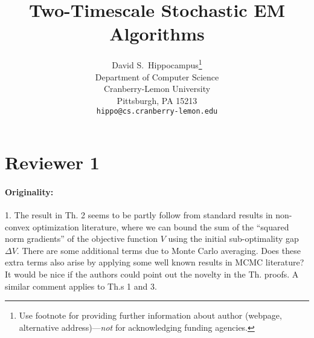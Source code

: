 \documentclass[anon,12pt]{alt2021} %
\title{Two-Timescale Stochastic EM Algorithms\vspace{-0.15in}}
\begin{document}
\maketitle


\author{%
  David S.~Hippocampus\thanks{Use footnote for providing further information
    about author (webpage, alternative address)---\emph{not} for acknowledging
    funding agencies.} \\
  Department of Computer Science\\
  Cranberry-Lemon University\\
  Pittsburgh, PA 15213 \\
  \texttt{hippo@cs.cranberry-lemon.edu} \\
}





\section{Reviewer 1}

\paragraph{Originality:}

1. The result in Th. 2 seems to be partly follow from standard results in non-convex optimization literature, where we can bound the
sum of the ``squared norm gradients'' of the objective function $V$ using the initial sub-optimality gap $\Delta V$. There are some
additional terms due to Monte Carlo averaging. Does these extra terms also arise by applying some well known results in MCMC literature?
It would be nice if the authors could point out the novelty in the Th. proofs. A similar comment applies to Th.s 1 and 3.
\end{document}
